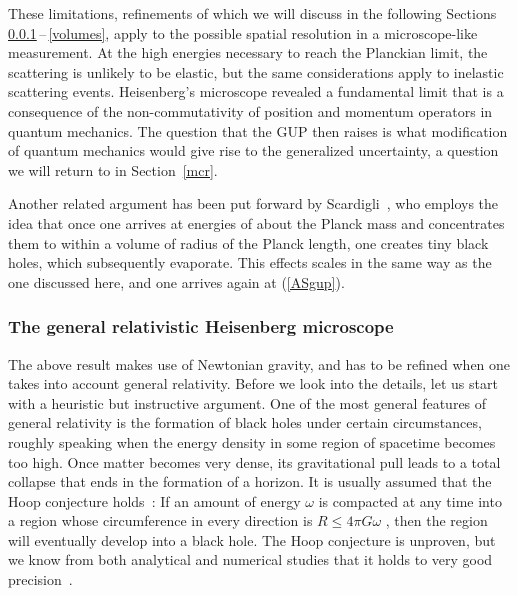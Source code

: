 \documentclass{article}
\begin{document}
These limitations, refinements of which we will discuss in the following Sections \ref{grhm}\,--\,\ref{volumes}, apply to the possible spatial
resolution in a microscope-like measurement. At the high energies necessary to reach the Planckian limit, the scattering
is unlikely to be elastic, but the same considerations apply to inelastic scattering events. Heisenberg's microscope
revealed a fundamental limit that is a consequence of the non-commutativity of position and momentum operators in
quantum mechanics. The question that the GUP then raises is what modification
of quantum mechanics would give rise to the generalized uncertainty, a question we will return to in Section~\ref{mcr}.

Another related argument has been put forward by Scardigli~\cite{Scardigli:1999jh}, who employs the idea that once
one arrives at energies of about the Planck mass and concentrates them to within a volume of radius of the Planck
length, one creates tiny black holes, which subsequently evaporate. This effects scales in the same
way as the one discussed here, and one arrives again at (\ref{ASgup}). 

\subsubsection{The general relativistic Heisenberg microscope}
\label{grhm}

The above result makes use of Newtonian gravity, and has to be refined when one takes into account
general relativity. Before we look into the details, let us start with a heuristic but instructive argument.
One of the most general features of general relativity is the formation of black holes under
certain circumstances, roughly speaking when the energy density in some region of spacetime
becomes too high. Once matter becomes very dense, its gravitational pull leads to a total
collapse that ends in the formation of a horizon.%
It is usually assumed that the
Hoop conjecture holds~\cite{Hoop}:  If an amount of energy $\omega$ is compacted at any time into
a region whose circumference in every direction is $R \leq 4 \pi G \omega$ , then the region will eventually 
develop into a black hole. The Hoop conjecture is unproven, but we know from both analytical and numerical
studies that it holds to very good precision~\cite{Eardley:2002re,Hsu:2002bd}.
\end{document}
